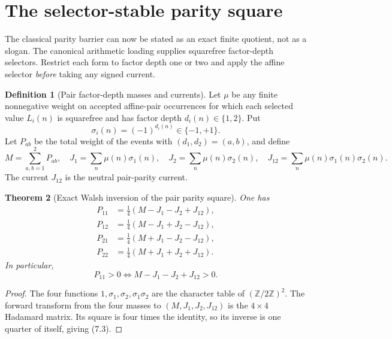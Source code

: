 \documentclass[11pt]{article}
\newtheorem{theorem}{Theorem}[section]
\theoremstyle{definition}
\newtheorem{definition}[theorem]{Definition}
\theoremstyle{remark}
\newcommand{\Z}{\mathbb Z}
\begin{document}
\section{The selector-stable parity square}
\label{sec:parity-square}

The classical parity barrier can now be stated as an exact finite quotient,
not as a slogan.  The canonical arithmetic loading supplies squarefree
factor-depth selectors.  Restrict each form to factor depth one or two and
apply the affine selector \emph{before} taking any signed current.

\begin{definition}[Pair factor-depth masses and currents]
\label{def:pair-parity}
Let $\mu$ be any finite nonnegative weight on accepted affine-pair occurrences
for which each selected value $L_i(n)$ is squarefree and has factor depth
$d_i(n)\in\{1,2\}$.  Put
\[
 \sigma_i(n)=(-1)^{d_i(n)}\in\{-1,+1\}.
 \tag{7.1}
\]
Let $P_{ab}$ be the total weight of the events with $(d_1,d_2)=(a,b)$, and
define
\[
 M=\sum_{a,b=1}^2P_{ab},
 \quad
 J_1=\sum_n\mu(n)\sigma_1(n),
 \quad
 J_2=\sum_n\mu(n)\sigma_2(n),
 \quad
 J_{12}=\sum_n\mu(n)\sigma_1(n)\sigma_2(n).
 \tag{7.2}
\]
The current $J_{12}$ is the neutral pair-parity current.
\end{definition}

\begin{theorem}[Exact Walsh inversion of the pair parity square]
\label{thm:Walsh-parity}
One has
\[
 \boxed{
 \begin{aligned}
 P_{11}&=\frac14(M-J_1-J_2+J_{12}),\\
 P_{12}&=\frac14(M-J_1+J_2-J_{12}),\\
 P_{21}&=\frac14(M+J_1-J_2-J_{12}),\\
 P_{22}&=\frac14(M+J_1+J_2+J_{12}).
 \end{aligned}}
 \tag{7.3}
\]
In particular,
\[
 \boxed{P_{11}>0
 \iff M-J_1-J_2+J_{12}>0.}
 \tag{7.4}
\]
\end{theorem}

\begin{proof}
The four functions
$1,\sigma_1,\sigma_2,\sigma_1\sigma_2$ are the character table of
$(\Z/2\Z)^2$.  The forward transform from the four masses to
$(M,J_1,J_2,J_{12})$ is the $4\times4$ Hadamard matrix.  Its square is four
times the identity, so its inverse is one quarter of itself, giving
\textup{(7.3)}.
\end{proof}
\end{document}
